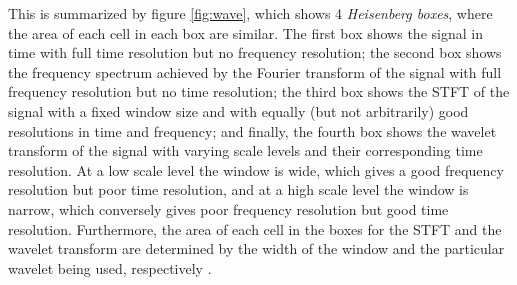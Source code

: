 This is summarized by figure \ref{fig:wave}, which shows 4 \textit{Heisenberg boxes}, where the area of each cell in each box are similar. The first box shows the signal in time with full time resolution but no frequency resolution; the second box shows the frequency spectrum achieved by the Fourier transform of the signal with full frequency resolution but no time resolution; the third box shows the STFT of the signal with a fixed window size and with equally (but not arbitrarily) good resolutions in time and frequency; and finally, the fourth box shows the wavelet transform of the signal with varying scale levels and their corresponding time resolution. At a low scale level the window is wide, which gives a good frequency resolution but poor time resolution, and at a high scale level the window is narrow, which conversely gives poor frequency resolution but good time resolution. Furthermore, the area of each cell in the boxes for the STFT and the wavelet transform are determined by the width of the window and the particular wavelet being used, respectively \cite{pages 409-410, Wang} \cite{page 43-44, wave_tut}.

